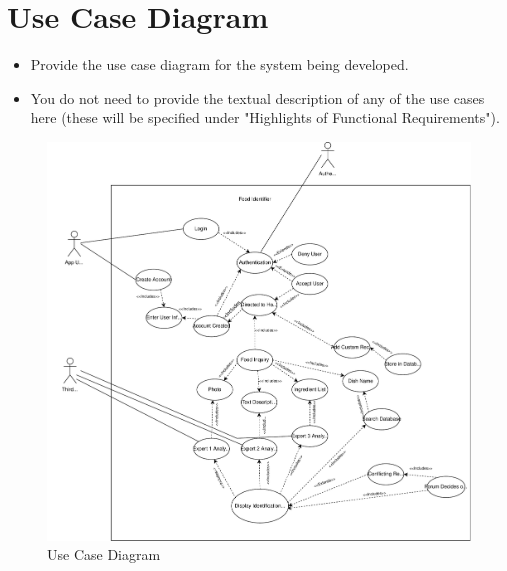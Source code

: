 \documentclass[]{article}
\begin{document}
\section{Use Case Diagram}
\label{sec:use_case_diagram}
\begin{itemize}
	\item Provide the use case diagram for the system being developed.
	\item You do not need to provide the textual description of any of the use cases here (these will be specified under "Highlights of Functional Requirements").
\end{itemize}


\begin{figure}[H]
    \centering
    \includegraphics[width=\textwidth]{image/3_use_case_diagram.pdf}
    \caption{Use Case Diagram}
\end{figure}

\end{document}

